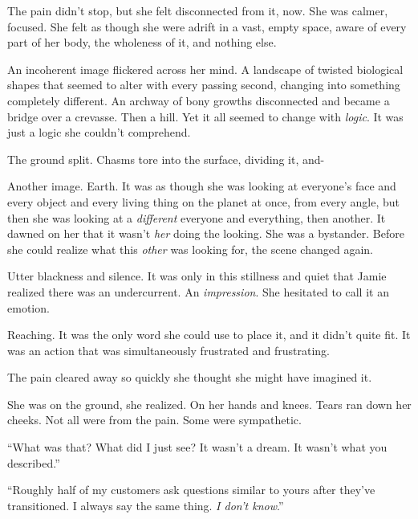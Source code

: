 The pain didn't stop, but she felt disconnected from it, now.  She was calmer, focused.  She felt as though she were adrift in a vast, empty space, aware of every part of her body, the wholeness of it, and nothing else.



An incoherent image flickered across her mind.  A landscape of twisted biological shapes that seemed to alter with every passing second, changing into something completely different.  An archway of bony growths disconnected and became a bridge over a crevasse.  Then a hill.  Yet it all seemed to change with \emph{logic}.  It was just a logic she couldn't comprehend.



The ground split.  Chasms tore into the surface, dividing it, and-



Another image.  Earth.  It was as though she was looking at everyone's face and every object and every living thing on the planet at once, from every angle, but then she was looking at a \emph{different }everyone and everything, then another.  It dawned on her that it wasn't \emph{her} doing the looking.  She was a bystander.  Before she could realize what this \emph{other} was looking for, the scene changed again.



Utter blackness and silence.  It was only in this stillness and quiet that Jamie realized there was an undercurrent.  An \emph{impression}.  She hesitated to call it an emotion.



Reaching.  It was the only word she could use to place it, and it didn't quite fit.  It was an action that was simultaneously frustrated and frustrating.



The pain cleared away so quickly she thought she might have imagined it.



She was on the ground, she realized.  On her hands and knees.  Tears ran down her cheeks.  Not all were from the pain.  Some were sympathetic.



``What was that?  What did I just see?  It wasn't a dream.  It wasn't what you described.''



``Roughly half of my customers ask questions similar to yours after they've transitioned.  I always say the same thing.  \emph{I don't know}.''



